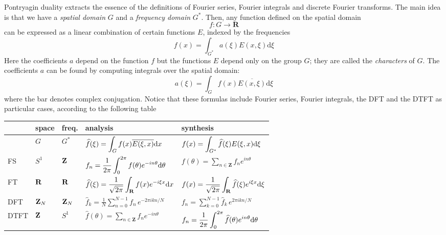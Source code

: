 Pontryagin duality extracts the essence of the definitions of Fourier
series, Fourier integrals and discrete Fourier transforms.  The main idea is
that we have a \emph{spatial domain} $G$ and a \emph{frequency domain} $G^*$.
Then, any function defined on the spatial domain
\begin{equation}
f:G\to\mathbf{R}
\end{equation}
can be expressed as a linear combination of certain functions $E$, indexed by
the frequencies
\begin{equation}
f(x) = \int_{G^*} a(\xi) E(x,\xi) \mathrm{d} \xi
\end{equation}
Here the coefficients $a$ depend on the function $f$ but the functions $E$
depend only on the group $G$; they are called the \emph{characters} of $G$.
The coefficients $a$ can be found by computing integrals over the spatial
domain:
\begin{equation}
	a(\xi) = \int_G f(x) \overline{E(x,\xi)} \mathrm{d} \xi
\end{equation}
where the bar denotes complex conjugation.
Notice that these formulas include Fourier series, Fourier integrals, the
DFT and the DTFT as particular cases, according to the following table

\begin{tabular}{l|llll}
	 & space & freq. & analysis & synthesis \\
	\hline
	&
	$G$ &
	$G^*$ &
	$\displaystyle\widehat{f}(\xi)=\int_G f(x) \overline{E(\xi,x)}\mathrm{d} x$ &
	$\displaystyle f(x)=\int_{G^*} \widehat{f}(\xi)E(\xi,x)\mathrm{d}\xi$
	\\
	FS &
	$S^1$ &
	$\mathbf{Z}$ &
	$\displaystyle f_n =
			\frac{1}{2\pi}\int_0^{2\pi} f(\theta)e^{-in\theta}\mathrm{d}\theta$ &
	$\displaystyle f(\theta)=\sum_{n\in\mathbf{Z}} f_n
			e^{in\theta}$
	\\
	FT &
	$\mathbf{R}$ &
	$\mathbf{R}$ &
	$\displaystyle\widehat{f}(\xi)=\frac{1}{\sqrt{2\pi}}\int_{\mathbf{R}} f(x)e^{-i\xi x}\mathrm{d} x$ &
	$\displaystyle f(x)=\frac{1}{\sqrt{2\pi}}\int_{\mathbf{R}} \widehat{f}(\xi)e^{i\xi x}\mathrm{d} \xi$
	\\
	DFT &
	$\mathbf{Z}_N$ &
	$\mathbf{Z}_N$ &
	$\displaystyle\widehat{f}_k=\frac{1}{N}\sum_{n=0}^{N-1}f_n\,e^{-2\pi ikn/N}$ &
	$\displaystyle f_n=\sum_{k=0}^{N-1}\widehat{f}_k\,e^{2\pi ikn/N}$
	\\
	DTFT &
	$\mathbf{Z}$ &
	$S^1$ &
	$\displaystyle \widehat{f}(\theta)=\sum_{n\in\mathbf{Z}} f_n e^{-in\theta}$ &
	$\displaystyle f_n = \frac{1}{2\pi}\int_0^{2\pi}\widehat{f}(\theta)e^{in\theta}\mathrm{d}\theta$
\end{tabular}

